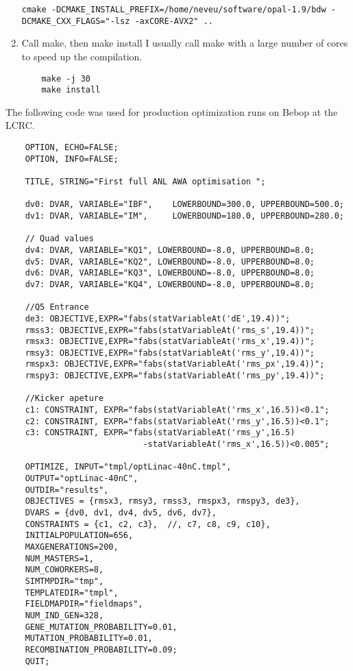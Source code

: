 \documentclass[table]{iitthesis}
\begin{document}
\begin{enumerate}[label=Step \arabic*:]
\begin{lstlisting}
cmake -DCMAKE_INSTALL_PREFIX=/home/neveu/software/opal-1.9/bdw -DCMAKE_CXX_FLAGS="-lsz -axCORE-AVX2" ..
\end{lstlisting}

    \item Call make, then make install
I usually call make with a large number of cores to speed up the compilation.    
\begin{lstlisting}
	make -j 30 
	make install
\end{lstlisting}

\end{enumerate}




\label{3dmaps}


 \label{opt-tba-code}
The following code was used for production optimization runs on Bebop at the LCRC.
\makeatletter
\let\@currsize\normalsize
\makeatother 
\begin{singlespacing}
	\begin{verbatim}
	OPTION, ECHO=FALSE;
	OPTION, INFO=FALSE;
	
	TITLE, STRING="First full ANL AWA optimisation ";
	
	dv0: DVAR, VARIABLE="IBF",    LOWERBOUND=300.0, UPPERBOUND=500.0;
	dv1: DVAR, VARIABLE="IM",     LOWERBOUND=180.0, UPPERBOUND=280.0;
	
	// Quad values
	dv4: DVAR, VARIABLE="KQ1", LOWERBOUND=-8.0, UPPERBOUND=8.0;
	dv5: DVAR, VARIABLE="KQ2", LOWERBOUND=-8.0, UPPERBOUND=8.0;
	dv6: DVAR, VARIABLE="KQ3", LOWERBOUND=-8.0, UPPERBOUND=8.0;
	dv7: DVAR, VARIABLE="KQ4", LOWERBOUND=-8.0, UPPERBOUND=8.0;
	
	//Q5 Entrance
	de3: OBJECTIVE,EXPR="fabs(statVariableAt('dE',19.4))";
	rmss3: OBJECTIVE,EXPR="fabs(statVariableAt('rms_s',19.4))";
	rmsx3: OBJECTIVE,EXPR="fabs(statVariableAt('rms_x',19.4))";
	rmsy3: OBJECTIVE,EXPR="fabs(statVariableAt('rms_y',19.4))";
	rmspx3: OBJECTIVE,EXPR="fabs(statVariableAt('rms_px',19.4))";
	rmspy3: OBJECTIVE,EXPR="fabs(statVariableAt('rms_py',19.4))";
	
	//Kicker apeture
	c1: CONSTRAINT, EXPR="fabs(statVariableAt('rms_x',16.5))<0.1";
	c2: CONSTRAINT, EXPR="fabs(statVariableAt('rms_y',16.5))<0.1";
	c3: CONSTRAINT, EXPR="fabs(statVariableAt('rms_y',16.5)
							-statVariableAt('rms_x',16.5))<0.005";
	
	OPTIMIZE, INPUT="tmpl/optLinac-40nC.tmpl",
	OUTPUT="optLinac-40nC",
	OUTDIR="results",
	OBJECTIVES = {rmsx3, rmsy3, rmss3, rmspx3, rmspy3, de3},
	DVARS = {dv0, dv1, dv4, dv5, dv6, dv7},
	CONSTRAINTS = {c1, c2, c3},  //, c7, c8, c9, c10},
	INITIALPOPULATION=656,
	MAXGENERATIONS=200,
	NUM_MASTERS=1,
	NUM_COWORKERS=8,
	SIMTMPDIR="tmp",
	TEMPLATEDIR="tmpl",
	FIELDMAPDIR="fieldmaps",
	NUM_IND_GEN=328,
	GENE_MUTATION_PROBABILITY=0.01,
	MUTATION_PROBABILITY=0.01,
	RECOMBINATION_PROBABILITY=0.09;
	QUIT;
	\end{verbatim}	
\end{singlespacing}



\newpage
%
%


\end{document}
